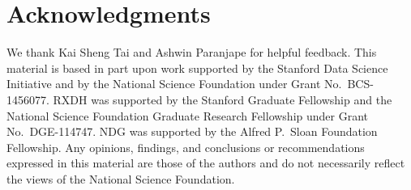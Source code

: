 \documentclass[11pt,letterpaper]{article}
\renewcommand{\|}{\mid}
\begin{document}
\section*{Acknowledgments}

We thank Kai Sheng Tai and Ashwin Paranjape for helpful feedback.
This material is based in part upon work supported by the 
Stanford Data Science Initiative and by the National Science Foundation
under Grant No.\ BCS-1456077.
RXDH was supported by the Stanford Graduate Fellowship and the
National Science Foundation Graduate Research Fellowship under Grant No.\ DGE-114747.
NDG was supported by the Alfred P.\ Sloan Foundation Fellowship.
Any opinions, findings, and conclusions or recommendations 
expressed in this material are those of the authors and do not necessarily
reflect the views of the National Science Foundation.
\end{document}

